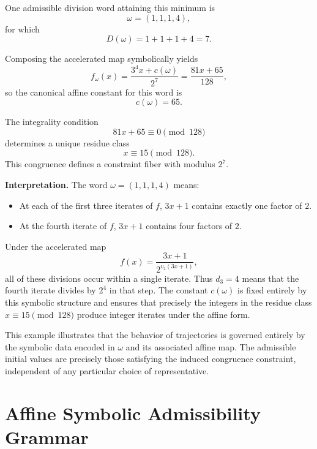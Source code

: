 \documentclass[12pt, oneside]{article}
\numberwithin{equation}{section}
\theoremstyle{definition}
\theoremstyle{plain}
\theoremstyle{remark}
\begin{document}
One admissible division word attaining this minimum is
\[
\omega = (1,1,1,4),
\]
for which
\[
D(\omega) = 1+1+1+4 = 7.
\]

Composing the accelerated map symbolically yields
\[
f_\omega(x)=\frac{3^4 x + c(\omega)}{2^7}
           = \frac{81x + 65}{128},
\]
so the canonical affine constant for this word is
\[
c(\omega)=65.
\]

The integrality condition
\[
81x + 65 \equiv 0 \pmod{128}
\]
determines a unique residue class
\[
x \equiv 15 \pmod{128}.
\]
This congruence defines a constraint fiber with modulus $2^7$.

\medskip

\noindent
\textbf{Interpretation.}
The word $\omega = (1,1,1,4)$ means:

\begin{itemize}
    \item At each of the first three iterates of $f$, $3x+1$ contains exactly one factor of $2$.
    \item At the fourth iterate of $f$, $3x+1$ contains four factors of $2$.
\end{itemize}

Under the accelerated map
\[
f(x)=\frac{3x+1}{2^{v_2(3x+1)}},
\]
all of these divisions occur within a single iterate. Thus $d_3=4$ means that
the fourth iterate divides by $2^4$ in that step. The constant $c(\omega)$ is
fixed entirely by this symbolic structure and ensures that precisely the
integers in the residue class $x \equiv 15 \pmod{128}$ produce integer iterates
under the affine form.

\medskip

This example illustrates that the behavior of trajectories is governed
entirely by the symbolic data encoded in $\omega$ and its associated
affine map. The admissible initial values are precisely those satisfying
the induced congruence constraint, independent of any particular choice
of representative.

\section{Affine Symbolic Admissibility Grammar}
\label{sec:affine-grammar}
\end{document}
